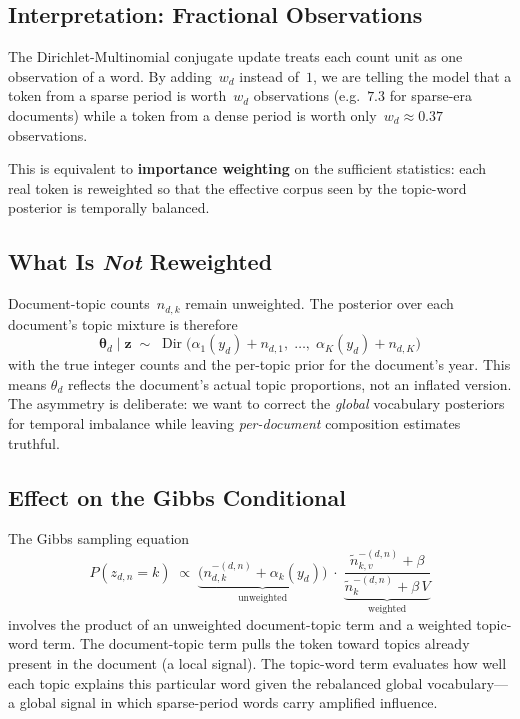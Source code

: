 \documentclass[11pt]{article}
\begin{document}
\subsection{Interpretation: Fractional Observations}

The Dirichlet-Multinomial conjugate update treats each count unit as one observation of a word.
By adding~$w_d$ instead of~$1$, we are telling the model that a token from a sparse period is worth~$w_d$ observations (e.g.\ $7.3$ for sparse-era documents) while a token from a dense period is worth only~$w_d \approx 0.37$ observations.

This is equivalent to \textbf{importance weighting} on the sufficient statistics: each real token is reweighted so that the effective corpus seen by the topic-word posterior is temporally balanced.

\subsection{What Is \emph{Not} Reweighted}

Document-topic counts~$n_{d,k}$ remain unweighted.
The posterior over each document's topic mixture is therefore
\[
\boldsymbol\theta_d \mid \mathbf z
  \;\sim\;
  \operatorname{Dir}\!\bigl(\alpha_1(y_d) + n_{d,1},\;\ldots,\;\alpha_K(y_d) + n_{d,K}\bigr)
\]
with the true integer counts and the per-topic prior for the document's year.
This means $\theta_d$ reflects the document's actual topic proportions, not an inflated version.
The asymmetry is deliberate: we want to correct the \emph{global} vocabulary posteriors for temporal imbalance while leaving \emph{per-document} composition estimates truthful.

\subsection{Effect on the Gibbs Conditional}

The Gibbs sampling equation
\[
P(z_{d,n} = k) \;\propto\;
  \underbrace{\bigl(n_{d,k}^{-(d,n)} + \alpha_k(y_d)\bigr)}_{\text{unweighted}}
  \;\cdot\;
  \underbrace{\frac{\tilde n_{k,v}^{-(d,n)} + \beta}{\tilde n_k^{-(d,n)} + \beta\,V}}_{\text{weighted}}
\]
involves the product of an unweighted document-topic term and a weighted topic-word term.
The document-topic term pulls the token toward topics already present in the document (a local signal).
The topic-word term evaluates how well each topic explains this particular word given the rebalanced global vocabulary---a global signal in which sparse-period words carry amplified influence.
\end{document}
